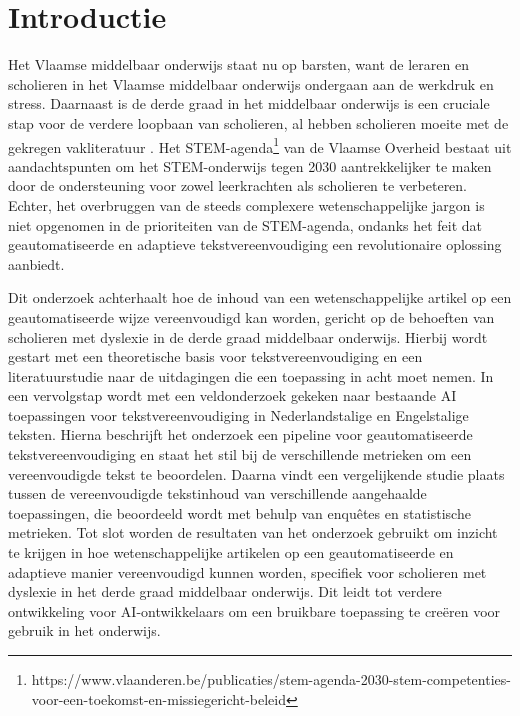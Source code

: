 
\section{Introductie}%
\label{sec:introductie}


Het Vlaamse middelbaar onderwijs staat nu op barsten, want de leraren en scholieren in het Vlaamse middelbaar onderwijs ondergaan aan de werkdruk en stress. Daarnaast is de derde graad in het middelbaar onderwijs is een cruciale stap voor de verdere loopbaan van scholieren, al hebben scholieren moeite met de gekregen vakliteratuur \autocite{Dapaah2022}. Het STEM-agenda\footnote{https://www.vlaanderen.be/publicaties/stem-agenda-2030-stem-competenties-voor-een-toekomst-en-missiegericht-beleid} van de Vlaamse Overheid bestaat uit aandachtspunten om het STEM-onderwijs tegen 2030 aantrekkelijker te maken door de ondersteuning voor zowel leerkrachten als scholieren te verbeteren. Echter, het overbruggen van de steeds complexere wetenschappelijke jargon is niet opgenomen in de prioriteiten van de STEM-agenda, ondanks het feit dat geautomatiseerde en adaptieve tekstvereenvoudiging een revolutionaire oplossing aanbiedt.

Dit onderzoek achterhaalt hoe de inhoud van een wetenschappelijke artikel op een geautomatiseerde wijze vereenvoudigd kan worden, gericht op de behoeften van scholieren met dyslexie in de derde graad middelbaar onderwijs. Hierbij wordt gestart met een theoretische basis voor tekstvereenvoudiging en een literatuurstudie naar de uitdagingen die een toepassing in acht moet nemen. In een vervolgstap wordt met een veldonderzoek gekeken naar bestaande AI toepassingen voor tekstvereenvoudiging in Nederlandstalige en Engelstalige teksten. Hierna beschrijft het onderzoek een pipeline voor geautomatiseerde tekstvereenvoudiging en staat het stil bij de verschillende metrieken om een vereenvoudigde tekst te beoordelen. Daarna vindt een vergelijkende studie plaats tussen de vereenvoudigde tekstinhoud van verschillende aangehaalde toepassingen, die beoordeeld wordt met behulp van enquêtes en statistische metrieken. Tot slot worden de resultaten van het onderzoek gebruikt om inzicht te krijgen in hoe wetenschappelijke artikelen op een geautomatiseerde en adaptieve manier vereenvoudigd kunnen worden, specifiek voor scholieren met dyslexie in het derde graad middelbaar onderwijs. Dit leidt tot verdere ontwikkeling voor AI-ontwikkelaars om een bruikbare toepassing te creëren voor gebruik in het onderwijs.


